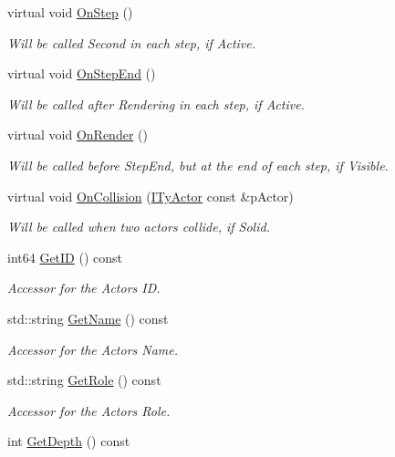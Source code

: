 \begin{DoxyCompactItemize}
virtual void \hyperlink{class_i_ty_actor_a78ac709f1fdbd9fba59180337be44a7a}{OnStep} ()
\begin{DoxyCompactList}\small\item\em Will be called Second in each step, if Active. \end{DoxyCompactList}\item 
virtual void \hyperlink{class_i_ty_actor_aa539311a3f8cf47dd325f6cb6e7413a6}{OnStepEnd} ()
\begin{DoxyCompactList}\small\item\em Will be called after Rendering in each step, if Active. \end{DoxyCompactList}\item 
virtual void \hyperlink{class_i_ty_actor_ac5a0f1ef9aca4cf49893171c130abb9c}{OnRender} ()
\begin{DoxyCompactList}\small\item\em Will be called before StepEnd, but at the end of each step, if Visible. \end{DoxyCompactList}\item 
virtual void \hyperlink{class_i_ty_actor_a88b1d350c4649d2df9e358f15fbca9b2}{OnCollision} (\hyperlink{class_i_ty_actor}{ITyActor} const \&pActor)
\begin{DoxyCompactList}\small\item\em Will be called when two actors collide, if Solid. \end{DoxyCompactList}\item 
int64 \hyperlink{class_i_ty_actor_a56e1581ea21a61d56ee13065b1bb237d}{GetID} () const 
\begin{DoxyCompactList}\small\item\em Accessor for the Actors ID. \end{DoxyCompactList}\item 
std::string \hyperlink{class_i_ty_actor_ad96e4d0568d002ec80b3f3511d34bac4}{GetName} () const 
\begin{DoxyCompactList}\small\item\em Accessor for the Actors Name. \end{DoxyCompactList}\item 
std::string \hyperlink{class_i_ty_actor_acb6782b902f1d23196ee5d4459a7f4c6}{GetRole} () const 
\begin{DoxyCompactList}\small\item\em Accessor for the Actors Role. \end{DoxyCompactList}\item 
int \hyperlink{class_i_ty_actor_a3a317a12d0872943894aef2ab1395c7c}{GetDepth} () const 

\end{DoxyCompactItemize}
